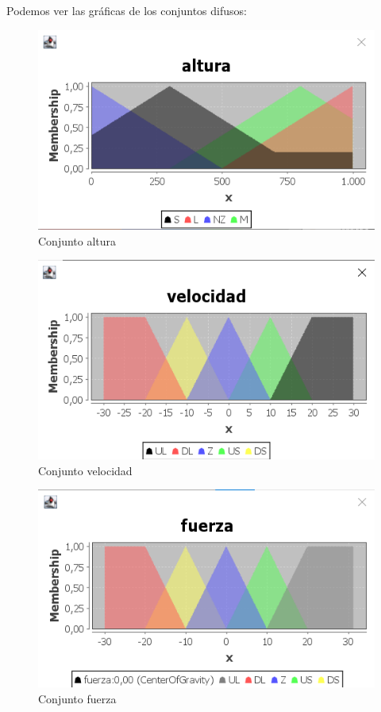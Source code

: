 \documentclass[
]{article}
\begin{document}
Podemos ver las gráficas de los conjuntos difusos:

\begin{figure}
\centering
\includegraphics{pegado4.png}
\caption{Conjunto altura}
\end{figure}

\begin{figure}
\centering
\includegraphics{pegado3.png}
\caption{Conjunto velocidad}
\end{figure}

\begin{figure}
\centering
\includegraphics{pegado2.png}
\caption{Conjunto fuerza}
\end{figure}
\end{document}
